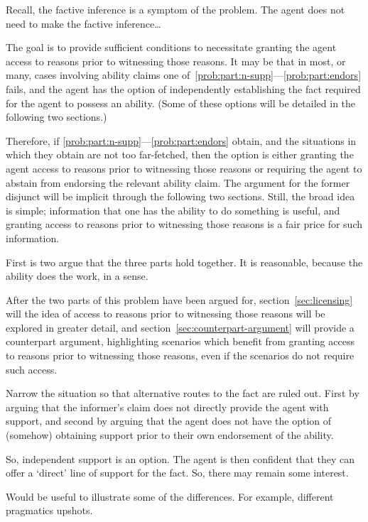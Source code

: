 \documentclass[10pt]{article}
\begin{document}
Recall, the factive inference is a symptom of the problem.
The agent does not need to make the factive inference\dots

The goal is to provide sufficient conditions to necessitate granting the agent access to reasons prior to witnessing those reasons.
It may be that in most, or many, cases involving ability claims one of~\ref{prob:part:n-supp}---\ref{prob:part:endors} fails, and the agent has the option of independently establishing the fact required for the agent to possess an ability.
(Some of these options will be detailed in the following two sections.)

Therefore, if \ref{prob:part:n-supp}---\ref{prob:part:endors} obtain, and the situations in which they obtain are not too far-fetched, then the option is either granting the agent access to reasons prior to witnessing those reasons or requiring the agent to abstain from endorsing the relevant ability claim.
The argument for the former disjunct will be implicit through the following two sections.
Still, the broad idea is simple; information that one has the ability to do something is useful, and granting access to reasons prior to witnessing those reasons is a fair price for such information.

{
  \color{red}
  First is two argue that the three parts hold together.
  It is reasonable, because the ability does the work, in a sense.
}

After the two parts of this problem have been argued for, section~\ref{sec:licensing} will the idea of access to reasons prior to witnessing those reasons will be explored in greater detail, and section~\ref{sec:counterpart-argument} will provide a counterpart argument, highlighting scenarios which benefit from granting access to reasons prior to witnessing those reasons, even if the scenarios do not require such access.


{
  \color{red}
  Narrow the situation so that alternative routes to the fact are ruled out.
  First by arguing that the informer's claim does not directly provide the agent with support, and second by arguing that the agent does not have the option of (somehow) obtaining support prior to their own endorsement of the ability.
}

\begin{note}
  So, independent support is an option.
  The agent is then confident that they can offer a `direct' line of support for the fact.
  So, there may remain some interest.

  Would be useful to illustrate some of the differences.
  For example, different pragmatics upshots.
\end{note}
\end{document}
